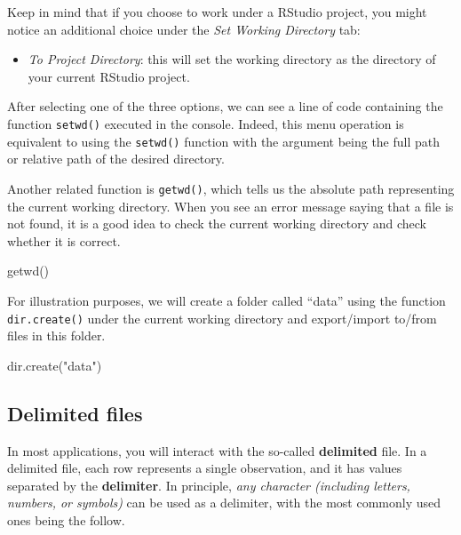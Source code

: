 \documentclass[
]{book}
\newenvironment{Shaded}{\begin{snugshade}}{\end{snugshade}}
\newcommand{\FunctionTok}[1]{\textcolor[rgb]{0.00,0.00,0.00}{#1}}
\newcommand{\NormalTok}[1]{#1}
\newcommand{\StringTok}[1]{\textcolor[rgb]{0.31,0.60,0.02}{#1}}
\providecommand{\tightlist}{%
  \setlength{\itemsep}{0pt}\setlength{\parskip}{0pt}}
\begin{document}
Keep in mind that if you choose to work under a RStudio project, you might notice an additional choice under the \emph{Set Working Directory} tab:

\begin{itemize}
\tightlist
\item
  \emph{To Project Directory}: this will set the working directory as the directory of your current RStudio project.
\end{itemize}

After selecting one of the three options, we can see a line of code containing the function \texttt{setwd()} executed in the console. Indeed, this menu operation is equivalent to using the \texttt{setwd()} function with the argument being the full path or relative path of the desired directory.

Another related function is \texttt{getwd()}, which tells us the absolute path representing the current working directory. When you see an error message saying that a file is not found, it is a good idea to check the current working directory and check whether it is correct.

\begin{Shaded}
\begin{Highlighting}[]
\FunctionTok{getwd}\NormalTok{()}
\end{Highlighting}
\end{Shaded}

For illustration purposes, we will create a folder called ``data'' using the function \texttt{dir.create()} under the current working directory and export/import to/from files in this folder.

\begin{Shaded}
\begin{Highlighting}[]
\FunctionTok{dir.create}\NormalTok{(}\StringTok{"data"}\NormalTok{)}
\end{Highlighting}
\end{Shaded}

\hypertarget{delimited-files}{%
\subsection{Delimited files}\label{delimited-files}}

In most applications, you will interact with the so-called \textbf{delimited} file. In a delimited file, each row represents a single observation, and it has values separated by the \textbf{delimiter}. In principle, \emph{any character (including letters, numbers, or symbols)} can be used as a delimiter, with the most commonly used ones being the follow.
\end{document}
